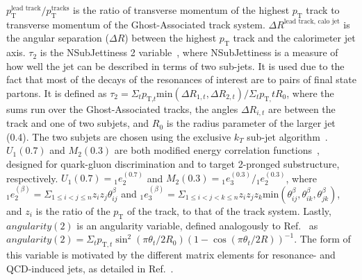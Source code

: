 \documentclass[NOTE, atlasdraft=true, texlive=2017, UKenglish]{\ATLASLATEXPATH atlasdoc}
\begin{document}
$p_\text{T}^{\text{lead\ track}}/p_\text{T}^{\text{tracks}}$ is the ratio of transverse momentum of the highest $p_\text{T}$ track to transverse momentum of the Ghost-Associated track system. $\Delta R^\text{lead\ track,\ calo\ jet}$ is the angular separation ($\Delta R$) between the highest $p_\text{T}$ track and the calorimeter jet axis. $\tau_{\text{2}}$ is the NSubJettiness 2 variable~\cite{Thaler:2010tr}, where NSubJettiness is a measure of how well the jet can be described in terms of two sub-jets. It is used due to the fact that most of the decays of the resonances of interest are to pairs of final state partons. It is defined as $\tau_2 = \Sigma_{t} p_{\text{T,}t}\text{min}(\Delta R_{1,t},\Delta R_{2,t})/\Sigma_{t}p_\text{T,}tR_0$, where the sums run over the Ghost-Associated tracks, the angles $\Delta R_{i,t}$ are between the track and one of two subjets, and $R_0$ is the radius parameter of the larger jet (0.4). The two subjets are chosen using the exclusive $k_T$ sub-jet algorithm~\cite{Thaler:2010tr}. $U_1(0.7)$ and $M_2(0.3)$ are both modified energy correlation functions~\cite{Moult:2016cvt}, designed for quark-gluon discrimination and to target 2-pronged substructure, respectively. $U_1(0.7)={}_1e^{(0.7)}_{2}$ and $M_2(0.3)={}_1e^{(0.3)}_{3}/{}_1e^{(0.3)}_{2}$, where ${}_1e^{(\beta)}_2 = \Sigma_{1\leq i < j \leq n} z_iz_j\theta^\beta_{ij}$ and ${}_1e^{(\beta)}_3 = \Sigma_{1\leq i < j < k \leq n} z_iz_jz_k\text{min}(\theta^\beta_{ij},\theta^\beta_{ik},\theta^\beta_{jk})$, and $z_i$ is the ratio of the $p_\text{T}$ of the track, to that of the track system. Lastly, $angularity(2)$ is an angularity variable, defined analogously to Ref.~\cite{Almeida:2008yp} as $angularity(2)=\Sigma_{t}p_{\text{T},t}\sin^2(\pi\theta_t/2R_0)(1-\cos(\pi\theta_t/2R))^{-1}$. The form of this variable is motivated by the different matrix elements for resonance- and QCD-induced jets, as detailed in Ref.~\cite{Almeida:2008yp}.


\end{document}
